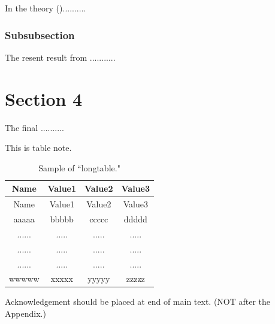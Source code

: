 \documentclass[]{pasj01}
\begin{document}
In the theory (\cite{key-2})..........

\subsubsection{Subsubsection}

The resent result from ...........


\newpage

\section{Section 4}

The final ..........



\begin{table}
  \label{tab:first}
\begin{tabnote}
This is table note.
\end{tabnote}
\end{table}

\begin{longtable}{cccc}
  \caption{Sample of ``longtable."}\label{tab:LTsample}
  \hline              
  Name & Value1 & Value2 & Value3 \\ 
\endfirsthead
  \hline
  Name & Value1 & Value2 & Value3 \\
\endhead
  \hline
\endfoot
  \hline
\endlastfoot
  \hline
  aaaaa & bbbbb & ccccc & ddddd \\
  ...... & ..... & ..... & ..... \\
  ...... & ..... & ..... & ..... \\
  ...... & ..... & ..... & ..... \\ 
  wwwww & xxxxx & yyyyy & zzzzz \\
\end{longtable}



\begin{ack}
Acknowledgement should be placed at end of main text.
(NOT after the Appendix.)
\end{ack}
\end{document}
